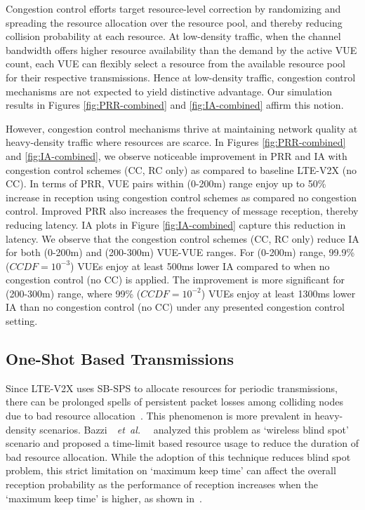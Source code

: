 \documentclass[iicol]{sn-jnl}%
\theoremstyle{thmstyleone}%
\theoremstyle{thmstyletwo}%
\theoremstyle{thmstylethree}%
\def\etal{\emph{~et~al. }}
\begin{document}
Congestion control efforts target resource-level correction by randomizing and spreading the resource allocation over the resource pool, and thereby reducing collision probability at each resource. At low-density traffic, when the channel bandwidth offers higher resource availability than the demand by the active VUE count, each VUE can flexibly select a resource from the available resource pool for their respective transmissions. Hence at low-density traffic, congestion control mechanisms are not expected to yield distinctive advantage. Our simulation results in Figures \ref{fig:PRR-combined} and \ref{fig:IA-combined} affirm this notion.

However, congestion control mechanisms thrive at maintaining network quality at heavy-density traffic where resources are scarce. In Figures \ref{fig:PRR-combined} and \ref{fig:IA-combined}, we observe noticeable improvement in PRR and IA with congestion control schemes (CC, RC only) as compared to baseline LTE-V2X (no CC). In terms of PRR, VUE pairs within (0-200m) range enjoy up to 50\% increase in reception using congestion control schemes as compared no congestion control. Improved PRR also increases the frequency of message reception, thereby reducing latency. IA plots in Figure \ref{fig:IA-combined} capture this reduction in latency. We observe that the congestion control schemes (CC, RC only) reduce IA for both (0-200m) and (200-300m) VUE-VUE ranges. For (0-200m) range, 99.9\% ($CCDF = 10^{-3}$) VUEs enjoy at least 500ms lower IA compared to when no congestion control (no CC) is applied. The improvement is more significant for (200-300m) range, where 99\% ($CCDF = 10^{-2}$) VUEs enjoy at least 1300ms lower IA than no congestion control (no CC) under any presented congestion control setting.


\subsection{One-Shot Based Transmissions}\label{subsec5.3}
Since LTE-V2X uses SB-SPS to allocate resources for periodic transmissions, there can be prolonged spells of persistent packet losses among colliding nodes due to bad resource allocation\mbox{~\cite{SAIFUDDIN2023}}. This phenomenon is more prevalent in heavy-density scenarios. 
Bazzi\mbox{~\etal~\cite{bazzi2020wireless}} analyzed this problem as `wireless blind spot' scenario and proposed a time-limit based resource usage to reduce the duration of bad resource allocation. While the adoption of this technique reduces blind spot problem, this strict limitation on `maximum keep time' can affect the overall reception probability as the performance of reception increases when the `maximum keep time' is higher, as shown in\mbox{~\cite{toghi2018multiple}}.
\end{document}
